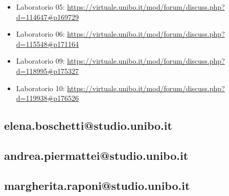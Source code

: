 \documentclass[a4paper,12pt]{report}
\begin{document}
\begin{itemize}
	\item Laboratorio 05: \url{https://virtuale.unibo.it/mod/forum/discuss.php?d=114647#p169729}
	
	\item Laboratorio 06: \url{https://virtuale.unibo.it/mod/forum/discuss.php?d=115548#p171164}
	
	\item Laboratorio 09: \url{https://virtuale.unibo.it/mod/forum/discuss.php?d=118995#p175327}
	
	\item Laboratorio 10: \url{https://virtuale.unibo.it/mod/forum/discuss.php?d=119938#p176526}
\end{itemize}

\subsection{elena.boschetti@studio.unibo.it}

\subsection{andrea.piermattei@studio.unibo.it}

\subsection{margherita.raponi@studio.unibo.it}
\end{document}
